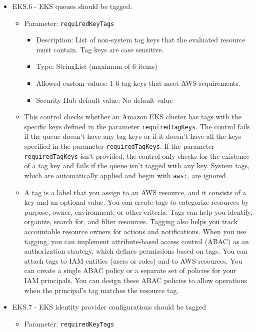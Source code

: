 \begin{mdframed}[backgroundcolor=gray!05, linecolor=gray!50]
\begin{itemize}
\begin{itemize}
    \end{itemize}
    \item EKS.6 - EKS queues should be tagged.
    \begin{itemize}
        \item Parameter: \texttt{requiredKeyTags}
        \begin{itemize}
        \item Description: List of non-system tag keys that the evaluated resource must contain. Tag keys are case sensitive.	
        \item Type: StringList (maximum of 6 items) 
        \item Allowed custom values: 1-6 tag keys that meet AWS requirements.
        \item Security Hub default value: No default value
        \end{itemize}
        \item This control checks whether an Amazon EKS cluster has tags with the specific keys defined in the parameter \texttt{requiredTagKeys}. The control fails if the queue doesn't have any tag keys or if it doesn't have all the keys specified in the parameter \texttt{requiredTagKeys}. If the parameter \texttt{requiredTagKeys} isn't provided, the control only checks for the existence of a tag key and fails if the queue isn't tagged with any key. System tags, which are automatically applied and begin with \texttt{aws:}, are ignored. 
        \item A tag is a label that you assign to an AWS resource, and it consists of a key and an optional value. You can create tags to categorize resources by purpose, owner, environment, or other criteria. Tags can help you identify, organize, search for, and filter resources. Tagging also helps you track accountable resource owners for actions and notifications. When you use tagging, you can implement attribute-based access control (ABAC) as an authorization strategy, which defines permissions based on tags. You can attach tags to IAM entities (users or roles) and to AWS resources. You can create a single ABAC policy or a separate set of policies for your IAM principals. You can design these ABAC policies to allow operations when the principal's tag matches the resource tag.
    \end{itemize}
    \item EKS.7 - EKS identity provider configurations should be tagged
    \begin{itemize}
        \item Parameter: \texttt{requiredKeyTags}

\end{itemize}
\end{itemize}
\end{mdframed}

